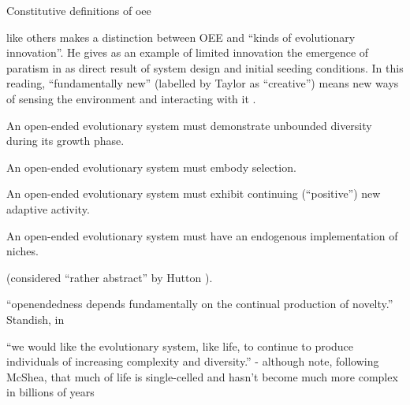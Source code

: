 Constitutive definitions of \gls{oee}

\parencite{Taylor2001} like others makes a distinction between OEE and ``kinds of evolutionary innovation''. He gives as an example of limited innovation the emergence of paratism in \cite{Ray1991} as direct result of system design and initial seeding conditions. In this reading, ``fundamentally new'' (labelled by Taylor as ``creative'') means new ways of sensing the environment and interacting with it \cite{Taylor2001}.


\begin{compactitem}
	\item An open-ended evolutionary system must demonstrate unbounded diversity during its growth phase.
	\item An open-ended evolutionary system must embody selection.
	\item An open-ended evolutionary system must exhibit continuing (``positive'') new adaptive activity.
	\item An open-ended evolutionary system must have an endogenous implementation of niches.
\end{compactitem} \cite{Maley1999} (considered ``rather abstract'' by Hutton \parencite[p.341]{Hutton2002}).

``openendedness depends fundamentally on the continual production of novelty.'' Standish, in \parencite{Soros2014}

``we would like the evolutionary system, like life, to continue to produce individuals of increasing complexity and diversity.'' -
although note, following McShea, that much of life is single-celled and hasn't become much more complex in billions of years \parencite{Maley1999}



